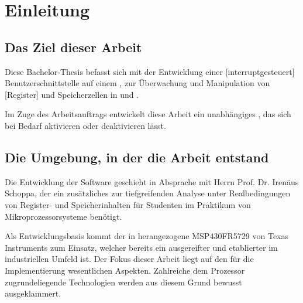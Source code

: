 
\chapter{Einleitung}
\label{cha:Einleitung}

\section{Das Ziel dieser Arbeit}
\label{sec:ZielDerArbeit}

Diese Bachelor-Thesis befasst sich mit der Entwicklung einer [interruptgesteuert] Benutzerschnittstelle auf einem , zur \"Uberwachung und Manipulation von [Register] und Speicherzellen in  und .

Im Zuge des Arbeitsauftrags entwickelt diese Arbeit ein unabh\"angiges , das sich bei Bedarf aktivieren oder deaktivieren l\"asst.

\section{Die Umgebung, in der die Arbeit entstand}
\label{sec:EntstehungsUmgebungArbeit}

Die Entwicklung der Software geschieht in Absprache mit Herrn Prof. Dr. Iren\"aus Schoppa, der ein zus\"atzliches  zur tiefgreifenden Analyse unter Realbedingungen von Register- und Speicherinhalten f\"ur Studenten im Praktikum von Mikroprozessorsysteme ben\"otigt.

Als Entwicklungsbasis kommt der in  herangezogene MSP430FR5729 von Texas Instruments zum Einsatz, welcher bereits ein ausgereifter und etablierter  im industriellen Umfeld ist. Der Fokus dieser Arbeit liegt auf den f\"ur die Implementierung wesentlichen Aspekten. Zahlreiche dem Prozessor zugrundeliegende Technologien werden aus diesem Grund bewusst ausgeklammert. 

